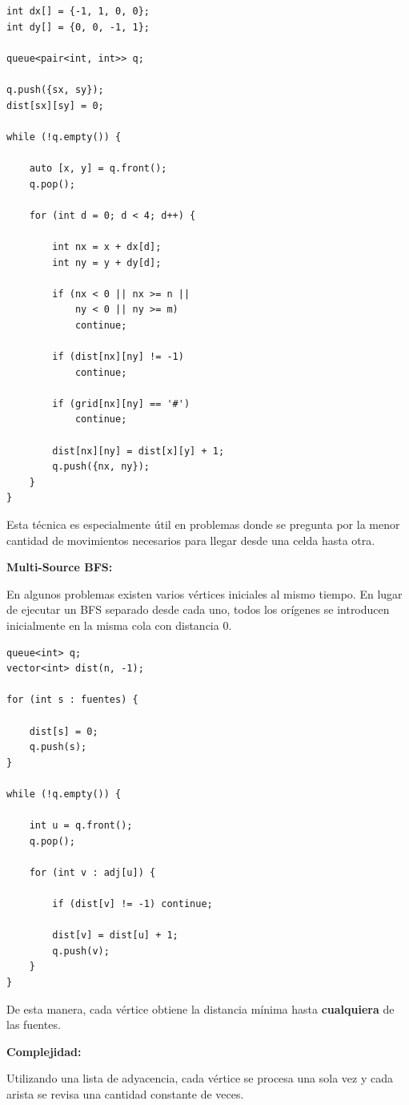 \documentclass[10pt,a4paper,twocolumn]{article}
\begin{document}
\begin{lstlisting}[style=cpp]
int dx[] = {-1, 1, 0, 0};
int dy[] = {0, 0, -1, 1};

queue<pair<int, int>> q;

q.push({sx, sy});
dist[sx][sy] = 0;

while (!q.empty()) {

    auto [x, y] = q.front();
    q.pop();

    for (int d = 0; d < 4; d++) {

        int nx = x + dx[d];
        int ny = y + dy[d];

        if (nx < 0 || nx >= n ||
            ny < 0 || ny >= m)
            continue;

        if (dist[nx][ny] != -1)
            continue;

        if (grid[nx][ny] == '#')
            continue;

        dist[nx][ny] = dist[x][y] + 1;
        q.push({nx, ny});
    }
}
\end{lstlisting}

Esta técnica es especialmente útil en problemas donde se pregunta
por la menor cantidad de movimientos necesarios para llegar desde
una celda hasta otra.

\textbf{Multi-Source BFS:}

En algunos problemas existen varios vértices iniciales al mismo
tiempo. En lugar de ejecutar un BFS separado desde cada uno, todos
los orígenes se introducen inicialmente en la misma cola con
distancia $0$.

\begin{lstlisting}[style=cpp]
queue<int> q;
vector<int> dist(n, -1);

for (int s : fuentes) {

    dist[s] = 0;
    q.push(s);
}

while (!q.empty()) {

    int u = q.front();
    q.pop();

    for (int v : adj[u]) {

        if (dist[v] != -1) continue;

        dist[v] = dist[u] + 1;
        q.push(v);
    }
}
\end{lstlisting}

De esta manera, cada vértice obtiene la distancia mínima hasta
\textbf{cualquiera} de las fuentes.

\textbf{Complejidad:}

Utilizando una lista de adyacencia, cada vértice se procesa una sola
vez y cada arista se revisa una cantidad constante de veces.
\end{document}
